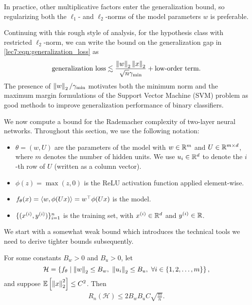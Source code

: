     In practice, other multiplicative factors enter the generalization bound, so regularizing both the $\ell_1$- and $\ell_2$-norms of the model parameters $w$ is preferable.

    Continuing with this rough style of analysis, for the hypothesis class with restricted $\ell_2$-norm, we can write the bound on the generalization gap in \eqref{lec7:eqn:generalization_loss} as
    \begin{equation}
        \text{generalization loss} \lesssim \frac{\Norm{w}_2\Norm{x}_2}{\sqrt{n}\gamma_{\mathrm{min}}} + \text{low-order term}.
    \end{equation}
    The presence of $\Norm{w}_2/\gamma_{\mathrm{min}}$ motivates both the minimum norm and the maximum margin formulations of the Support Vector Machine (SVM) problem as good methods to improve generalization performance of binary classifiers.

We now compute a bound for the Rademacher complexity of two-layer neural networks.  Throughout this section, we use the following notation:
\begin{itemize}
    \item $\theta = (w, U)$ are the parameters of the model with $w \in \R^m$ and $U \in \R^{m \times d}$, where $m$ denotes the number of hidden units. We use $u_i\in\R^d$ to denote the $i$-th row of $U$ (written as a column vector).
    \item $\phi(z) = \max(z, 0)$ is the ReLU activation function applied element-wise.
    \item $f_\theta(x) = \inprod{w,\phi(Ux)} = w^\top \phi(Ux)$ is the model.
    \item $\{ (x\sp{i}, y\sp{i}) \}_{i=1}^n$ is the training set, with $x\sp{i}\in\R^d$ and $y\sp{i}\in\R$.
\end{itemize}
We start with a somewhat weak bound which introduces the technical tools we need to derive tighter bounds subsequently.

\begin{theorem}\label{lec7:thm:thm_3}
    For some constants $B_w > 0$ and $B_u > 0$, let
    \begin{equation}
        \mathcal{H} = \cbr{ f_\theta \mid \Norm{w}_2 \leq B_w,\ \Norm{u_i}_2 \leq B_u,\ \forall i \in \{1,2,\dots,m\} }, \label{lec7:eqn:thm_3}
    \end{equation}
    and suppose $\E\sbr{\Norm{x}_2^2} \leq C^2$. Then
    \begin{align}
        R_n(\mathcal{H}) \le 2 B_w B_u C\sqrt{\frac{m}{n}}.
    \end{align}
\end{theorem}

